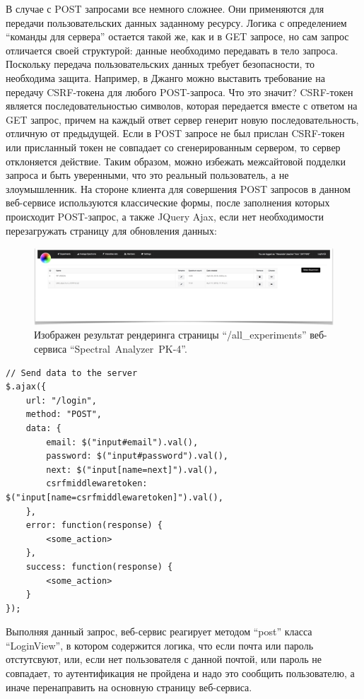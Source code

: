 В случае с POST запросами все немного сложнее. Они применяются для передачи пользовательских данных заданному ресурсу.
Логика с определением “команды для сервера” остается такой же, как и в GET запросе, но сам запрос отличается своей структурой:
данные необходимо передавать в тело запроса. Поскольку передача пользовательских данных требует безопасности, то
необходима защита. Например, в Джанго можно выставить требование на передачу CSRF-токена для любого POST-запроса.
Что это значит? CSRF-токен является последовательностью символов, которая передается вместе с ответом на GET запрос,
причем на каждый ответ сервер генерит новую последовательность, отличную от предыдущей. Если в POST запросе не был прислан
CSRF-токен или присланный токен не совпадает со сгенерированным сервером, то сервер отклоняется действие. Таким образом, можно
избежать межсайтовой подделки запроса и быть уверенными, что это реальный пользователь, а не злоумышленник.
На стороне клиента для совершения POST запросов в данном веб-сервисе используются
классические формы, после заполнения которых происходит POST-запрос, а также JQuery Ajax, если нет необходимости
перезагружать страницу для обновления данных:
\begin{figure}[t]
  \centering
  \includegraphics[width=16cm]{figures/all_experiments}
  \caption{Изображен результат рендеринга страницы “/all\_experiments” веб-сервиса “Spectral~Analyzer~PK-4”.}
  \label{fig:all_experiments}
\end{figure}
\begin{lstlisting}[style=htmlcssjs]
// Send data to the server
$.ajax({
    url: "/login",
    method: "POST",
    data: {
        email: $("input#email").val(),
        password: $("input#password").val(),
        next: $("input[name=next]").val(),
        csrfmiddlewaretoken: $("input[name=csrfmiddlewaretoken]").val(),
    },
    error: function(response) {
        <some_action>
    },
    success: function(response) {
        <some_action>
    }
});
\end{lstlisting}
Выполняя данный запрос, веб-сервис реагирует методом “post” класса “LoginView”, в котором содержится логика, что
если почта или пароль отстутсвуют, или, если нет пользователя с данной почтой, или пароль не совпадает, то аутентификация не пройдена
и надо это сообщить пользователю, а иначе перенаправить на основную страницу веб-сервиса.

